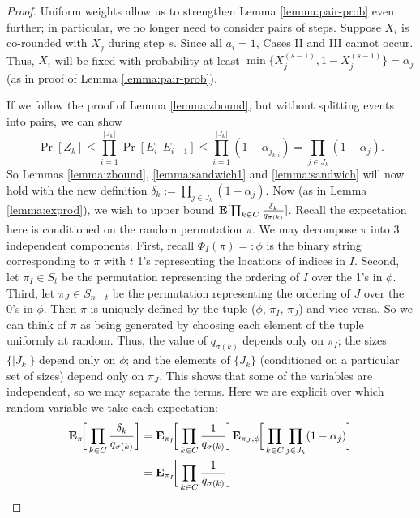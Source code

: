 \begin{proof}
Uniform weights allow us to strengthen Lemma \ref{lemma:pair-prob} even further; in particular, we no longer need to consider pairs of steps. Suppose $X_i$ is co-rounded with $X_j$ during step $s$. Since all $a_i=1$, Cases II and III cannot occur. Thus, $X_i$ will be fixed with probability at least $\min\{X_j^{(s-1)},1-X_j^{(s-1)}\}=\alpha_j$ (as in proof of Lemma \ref{lemma:pair-prob}).

If we follow the proof of Lemma \ref{lemma:zbound}, but without splitting events into pairs, we can show
$$\Pr[Z_k]
\le\prod_{i=1}^{|J_k|}\Pr\left[ E_i\,\Big\vert E_{i-1}\right]
\le \prod_{i=1}^{|J_k|} (1-\alpha_{j_{k,i}})=\prod_{j\in J_k}(1-\alpha_j).
$$
So Lemmas \ref{lemma:zbound}, \ref{lemma:sandwich1} and \ref{lemma:sandwich} will now hold with the new definition $\delta_k:=\prod_{j\in J_k}(1-\alpha_j)$. Now (as in Lemma \ref{lemma:exprod}), we wish to upper bound $\text{\bf E}[\prod_{k\in C} \frac{\delta_k}{q_{\sigma(k)}}]$. Recall the expectation here is conditioned on the random permutation $\pi$. We may decompose $\pi$ into 3 independent components. First, recall $\Phi_I(\pi)=:\phi$ is the binary string corresponding to $\pi$ with $t$ 1's representing the locations of indices in $I$. Second, let $\pi_I\in S_t$ be the permutation representing the ordering of $I$ over the 1's in $\phi$. Third, let $\pi_J\in S_{n-t}$ be the permutation representing the ordering of $J$ over the 0's in $\phi$. Then $\pi$ is uniquely defined by the tuple ($\phi$, $\pi_I$, $\pi_J$) and vice versa. So we can think of $\pi$ as being generated by choosing each element of the tuple uniformly at random. 
Thus, the value of $q_{\sigma(k)}$ depends only on $\pi_I$; the sizes $\{|J_k|\}$ depend only on $\phi$; and the elements of $\{J_k\}$ (conditioned on a particular set of sizes) depend only on $\pi_J$. This shows that some of the variables are independent, so we may separate the terms. Here we are explicit over which random variable we take each expectation:
\begin{align} 
\E_\pi\hspace{-2pt}\bigg[ \prod_{k\in C} \frac{\delta_k}{q_{\sigma(k)}} \bigg] 
&= \E_{\pi_I}\hspace{-2pt}\bigg[\prod_{k\in C}\frac{1}{q_{\sigma(k)}}\bigg] 
\E_{\pi_J,\phi}\hspace{-2pt}\bigg[ \prod_{k\in C} \prod_{j\in J_k}(1-\alpha_j)\bigg] \nonumber
\\&= \E_{\pi_I}\hspace{-2pt}\bigg[\prod_{k\in C}\frac{1}{q_{\sigma(k)}}\bigg] 

\end{align}
\end{proof}

